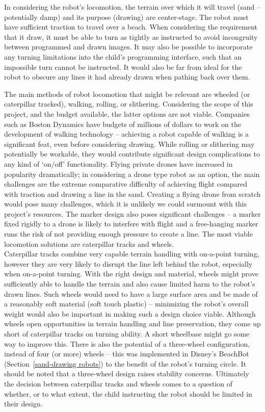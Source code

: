     In considering the robot's locomotion, the terrain over which it will travel (sand -- potentially damp) and its purpose (drawing) are center-stage. The robot must have sufficient traction to travel over a beach. When considering the requirement that it draw, it must be able to turn as tightly as instructed to avoid incongruity between programmed and drawn images. It may also be possible to incorporate any turning limitations into the child's programming interface, such that an impossible turn cannot be instructed. It would also be far from ideal for the robot to obscure any lines it had already drawn when pathing back over them.

    The main methods of robot locomotion that might be relevant are wheeled (or caterpillar tracked), walking, rolling, or slithering. Considering the scope of this project, and the budget available, the latter options are not viable. Companies such as Boston Dynamics have budgets of millions of dollars to work on the development of walking technology -- achieving a robot capable of walking is a significant feat, even before considering drawing. While rolling or slithering may potentially be workable, they would contribute significant design complications to any kind of `on/off' functionality. Flying private drones have increased in popularity dramatically; in considering a drone type robot as an option, the main challenges are the extreme comparative difficulty of achieving flight compared with traction and drawing a line in the sand. Creating a flying drone from scratch would pose many challenges, which it is unlikely we could surmount with this project's resources. The marker design also poses significant challenges -- a marker fixed rigidly to a drone is likely to interfere with flight and a free-hanging marker runs the risk of not providing enough pressure to create a line. The most viable locomotion solutions are caterpillar tracks and wheels.\\
    Caterpillar tracks combine very capable terrain handling with on-a-point turning, however they are very likely to disrupt the line left behind the robot, especially when on-a-point turning.  With the right design and material, wheels might prove sufficiently able to handle the terrain and also cause limited harm to the robot's drawn lines. Such wheels would need to have a large surface area and be made of a reasonably soft material (\eg soft touch plastic) -- minimizing the robot's overall weight would also be important in making such a design choice viable. Although wheels open opportunities in terrain handling and line preservation, they come up short of caterpillar tracks on turning ability. A short wheelbase might go some way to improve this. There is also the potential of a three-wheel configuration, instead of four (or more) wheels -- this was implemented in Disney's BeachBot (Section~\ref{sand-drawing robots}) to the benefit of the robot’s turning circle. It should be noted that a three-wheel design raises stability concerns. Ultimately the decision between caterpillar tracks and wheels comes to a question of whether, or to what extent, the child instructing the robot should be limited in their design.

